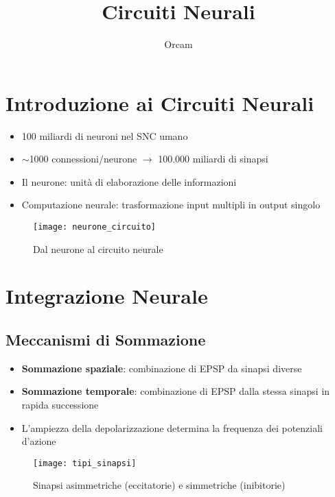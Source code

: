 \documentclass[12pt]{article}
\title{Circuiti Neurali}
\author{Orcam}
\date{}
\begin{document}
\maketitle

\section{Introduzione ai Circuiti Neurali}
\begin{itemize}
    \item 100 miliardi di neuroni nel SNC umano
    \item $\sim$1000 connessioni/neurone $\rightarrow$ 100.000 miliardi di sinapsi
    \item Il neurone: unità di elaborazione delle informazioni
    \item Computazione neurale: trasformazione input multipli in output singolo
\end{itemize}

\begin{figure}[h]
    \centering
    \texttt{[image: neurone\_circuito]}
    \caption{Dal neurone al circuito neurale}
\end{figure}

\section{Integrazione Neurale}
\subsection{Meccanismi di Sommazione}
\begin{itemize}
    \item \textbf{Sommazione spaziale}: combinazione di EPSP da sinapsi diverse
    \item \textbf{Sommazione temporale}: combinazione di EPSP dalla stessa sinapsi in rapida successione
    \item L'ampiezza della depolarizzazione determina la frequenza dei potenziali d'azione
\end{itemize}

\begin{figure}[h]
    \centering
    \texttt{[image: tipi\_sinapsi]}
    \caption{Sinapsi asimmetriche (eccitatorie) e simmetriche (inibitorie)}
\end{figure}
\end{document}
